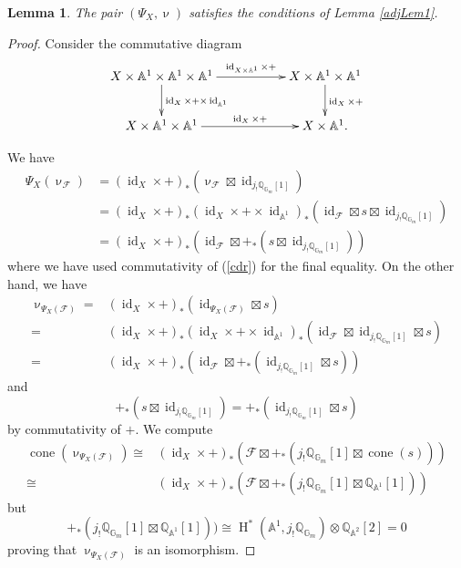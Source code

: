\documentclass[a4paper,10pt]{amsart}
\renewcommand{\nu}{\upnu}
\newtheorem{lemma}[theorem]{Lemma}
\renewcommand{\AA}{\mathbb{A}}
\newcommand{\QQ}{\mathbb{Q}}
\DeclareMathOperator{\id}{id}
\DeclareMathOperator{\cone}{cone}
\DeclareMathOperator{\HO}{H}
\begin{document}
\begin{lemma}
The pair $(\Psi_X,\nu)$ satisfies the conditions of Lemma \ref{adjLem1}.
\end{lemma}
\begin{proof}
Consider the commutative diagram
\begin{equation}
\label{cdr}
\xymatrix{
X\times\AA^1\times\AA^1\times\AA^1\ar[rr]^-{\id_{X\times\AA^1}\times+}\ar[d]^{\id_X\times+\times\id_{\AA^1}}&&X\times\AA^1\times\AA^1\ar[d]^{\id_X\times +}\\
X\times\AA^1\times\AA^1\ar[rr]^-{\id_X\times +}&&X\times \AA^1.
}
\end{equation}



We have 
\begin{align*}
\Psi_X(\nu_{\mathcal{F}})&=(\id_X\times +)_*(\nu_{\mathcal{F}}\boxtimes\id_{j_!\mathbb{Q}_{\mathbb{G}_m}[1]})
\\&=(\id_X\times +)_*(\id_X\times +\times \id_{\AA^1})_*(\id_{\mathcal{F}}\boxtimes s\boxtimes \id_{j_!\mathbb{Q}_{\mathbb{G}_m}[1]})
\\&=(\id_X\times +)_*(\id_{\mathcal{F}}\boxtimes +_*(s\boxtimes \id_{j_!\mathbb{Q}_{\mathbb{G}_m}[1]}))
\end{align*}
where we have used commutativity of (\ref{cdr}) for the final equality.  On the other hand, we have
\begin{align*}
\nu_{\Psi_X(\mathcal{F})}=&(\id_X\times+)_*(\id_{\Psi_X(\mathcal{F})}\boxtimes s)\\
=&(\id_X\times +)_*(\id_X\times +\times \id_{\AA^1})_*(\id_{\mathcal{F}}\boxtimes\id_{j_!\mathbb{Q}_{\mathbb{G}_m}[1]}\boxtimes s)\\
=&(\id_X\times +)_*(\id_{\mathcal{F}}\boxtimes +_*(\id_{j_!\mathbb{Q}_{\mathbb{G}_m}[1]}\boxtimes s))
\end{align*}
and
\[
+_*(s\boxtimes \id_{j_!\mathbb{Q}_{\mathbb{G}_m}[1]})=+_*(\id_{j_!\mathbb{Q}_{\mathbb{G}_m}[1]}\boxtimes s)
\]
by commutativity of $+$.  We compute 
\begin{align*}
\cone(\nu_{\Psi_X(\mathcal{F})})\cong&(\id_X\times +)_*(\mathcal{F}\boxtimes +_*(j_!\mathbb{Q}_{\mathbb{G}_m}[1]\boxtimes \cone(s)))\\
\cong&(\id_X\times +)_*(\mathcal{F}\boxtimes +_*(j_!\mathbb{Q}_{\mathbb{G}_m}[1]\boxtimes \QQ_{\AA^1}[1]))
\end{align*}
but 
\[
+_*(j_!\mathbb{Q}_{\mathbb{G}_m}[1]\boxtimes \QQ_{\AA^1}[1]))\cong \HO^*(\AA^1,j_!\mathbb{Q}_{\mathbb{G}_m})\otimes\QQ_{\AA^2}[2]=0
\]
proving that $\nu_{\Psi_X(\mathcal{F})}$ is an isomorphism.
\end{proof}
\end{document}
